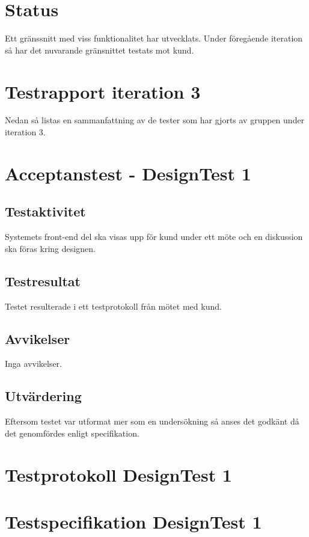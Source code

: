 \documentclass[a4paper,10pt, twoside]{article}
\begin{document}


\newpage
\section{Status}
Ett gränssnitt med viss funktionalitet har utvecklats. Under föregående iteration så har det nuvarande gränsnittet testats mot kund.  

\section{Testrapport iteration 3}
Nedan så listas en sammanfattning av de tester som har gjorts av gruppen under iteration 3.  

\section{Acceptanstest - DesignTest 1}
\subsection{Testaktivitet}
    Systemets front-end del ska visas upp för kund under ett möte och en diskussion ska föras kring designen.
\subsection{Testresultat}
    Testet resulterade i ett testprotokoll från mötet med kund.

\subsection{Avvikelser}
    Inga avvikelser.
\subsection{Utvärdering}
    Eftersom testet var utformat mer som en undersökning så anses det godkänt då det genomfördes enligt specifikation.

\clearpage
\appendix
\section{Testprotokoll DesignTest 1}

\section{Testspecifikation DesignTest 1}

\end{document}
